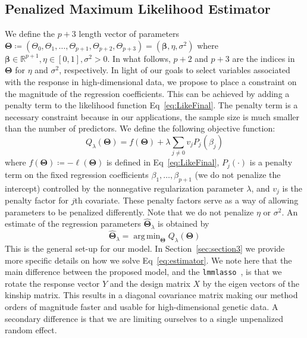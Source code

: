\documentclass[10pt,letterpaper]{article}
\newcommand{\bTheta}{\boldsymbol{\Theta}}
\newcommand{\bbeta}{\boldsymbol{\beta}}
\DeclareMathOperator*{\argmin}{arg\,min}
\begin{document}



\subsection*{Penalized Maximum Likelihood Estimator}
We define the $p+3$  length vector of parameters $\bTheta \coloneqq \left(\Theta_0, \Theta_1, \ldots, \Theta_{p+1}, \Theta_{p+2}, \Theta_{p+3}\right) =  \left(\bbeta, \eta, \sigma^2 \right)$ where $\bbeta \in \mathbb{R}^{p+1}, \eta \in [0,1], \sigma^2 >0$. In what follows, $p+2$ and $p+3$ are the indices in $\bTheta$ for $\eta$ and $\sigma^2$, respectively. In light of our goals to select variables associated with the response in high-dimensional data, we propose to place a constraint on the magnitude of the regression coefficients. This can be achieved by adding a penalty term to the likelihood function Eq~\ref{eq:LikeFinal}. The penalty term is a necessary constraint because in our applications, the sample size is much smaller than the number of predictors. We define the following objective function:
\begin{equation}
Q_{\lambda}(\bTheta) = f(\bTheta) + \lambda \sum_{j\neq 0} v_j P_j(\beta_j)
\end{equation}
where $f(\bTheta)\coloneqq-\ell(\bTheta)$ is defined in Eq~\ref{eq:LikeFinal}, $P_j(\cdot)$ is a penalty term on the fixed regression coefficients $\beta_1, \ldots, \beta_{p+1}$ (we do not penalize the intercept) controlled by the nonnegative regularization parameter $\lambda$, and $v_j$ is the penalty factor for $j$th covariate. These penalty factors serve as a way of allowing parameters to be penalized differently. Note that we do not penalize $\eta$ or $\sigma^2$. An estimate of the regression parameters $\widehat{\bTheta}_{\lambda}$ is obtained by
\begin{equation}
\widehat{\bTheta}_{\lambda} = \argmin_{\bTheta} Q_{\lambda}(\bTheta) \label{eq:estimator}
\end{equation}
This is the general set-up for our model. In Section~\ref{sec:section3} we provide more specific details on how we solve Eq~\ref{eq:estimator}. We note here that the main difference between the proposed model, and the \texttt{lmmlasso}~\cite{schelldorfer2011estimation}, is that we rotate the response vector $Y$ and the design matrix $X$ by the eigen vectors of the kinship matrix. This results in a diagonal covariance matrix making our method orders of magnitude faster and usable for high-dimensional genetic data. A secondary difference is that we are limiting ourselves to a single unpenalized random effect.
\end{document}

